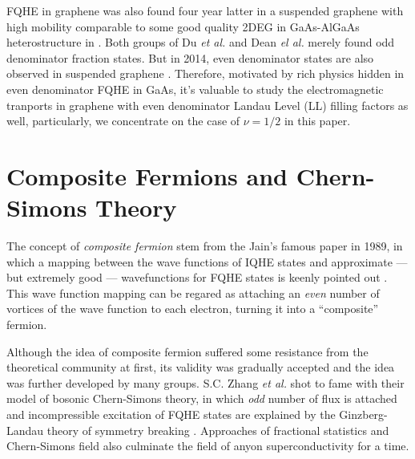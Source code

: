 \documentclass[bachelor,english,numbers]{ustcthesis}
\begin{document}
		FQHE in graphene was also found four year latter in a suspended graphene with high mobility comparable to some good quality 2DEG in GaAs-AlGaAs heterostructure in \cite{du2009fractional,dean2011multicomponent}. Both groups of Du {\it et al.} and Dean {\it el al.} merely found odd denominator fraction states. But in 2014, even denominator states are also observed in suspended graphene \cite{ki2014observation}. Therefore, motivated by rich physics hidden in even denominator FQHE in GaAs, it's valuable to study the electromagnetic tranports in graphene with even denominator Landau Level (LL) filling factors as well, particularly, we concentrate on the case of $\nu=1/2$ in this paper.

	\section{Composite Fermions and Chern-Simons Theory}
		\indent\par The concept of \emph{composite fermion} stem from the Jain's famous paper in 1989, in which a mapping between the wave functions of IQHE states and approximate --- but extremely good --- wavefunctions for FQHE states is keenly pointed out \cite{jain1989composite}. This wave function mapping can be regared as attaching an \emph{even} number of vortices of the wave function to each electron, turning it into a ``composite'' fermion.\par

		Although the idea of composite fermion suffered some resistance from the theoretical community at first, its validity was gradually accepted and the idea was further developed by many groups. S.C. Zhang {\it et al.} shot to fame with their model of bosonic Chern-Simons theory, in which \emph{odd} number of flux is attached and incompressible excitation of FQHE states are explained by the Ginzberg-Landau theory of symmetry breaking \cite{zhang1989effective}. Approaches of fractional statistics and Chern-Simons field also culminate the field of anyon superconductivity \cite{wilczek1990fractional,chen1989anyon} for a time.
\end{document}
